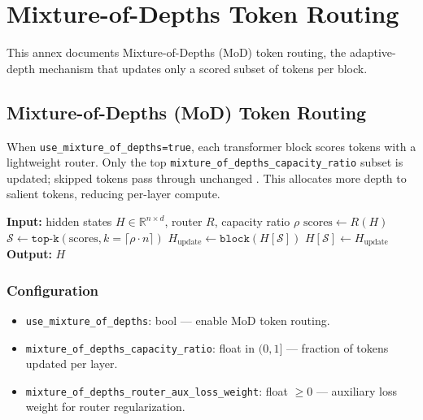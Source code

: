 \section{Mixture-of-Depths Token Routing}
\label{sec:annex-mod}

This annex documents Mixture-of-Depths (MoD) token routing, the adaptive-depth mechanism that updates only a scored subset of tokens per block.

\subsection{Mixture-of-Depths (MoD) Token Routing}

When \texttt{use\_mixture\_of\_depths=true}, each transformer block scores tokens with a lightweight router. Only the top \texttt{mixture\_of\_depths\_capacity\_ratio} subset is updated; skipped tokens pass through unchanged \citep{zhu2026mixtureofdepthsattention}. This allocates more depth to salient tokens, reducing per-layer compute.

\begin{algorithmic}[1]
\State \textbf{Input:} hidden states $H \in \mathbb{R}^{n \times d}$, router $R$, capacity ratio $\rho$
\State $\text{scores} \gets R(H)$ 
\State $\mathcal{S} \gets \texttt{top-k}(\text{scores}, k=\lceil \rho \cdot n \rceil)$ 
\State $H_{\text{update}} \gets \texttt{block}(H[\mathcal{S}])$ 
\State $H[\mathcal{S}] \gets H_{\text{update}}$ 
\State \textbf{Output:} $H$ 
\end{algorithmic}

\subsubsection{Configuration}
\begin{itemize}[leftmargin=*]
    \item \texttt{use\_mixture\_of\_depths}: bool --- enable MoD token routing.
    \item \texttt{mixture\_of\_depths\_capacity\_ratio}: float in $(0, 1]$ --- fraction of tokens updated per layer.
    \item \texttt{mixture\_of\_depths\_router\_aux\_loss\_weight}: float $\ge 0$ --- auxiliary loss weight for router regularization.
\end{itemize}

